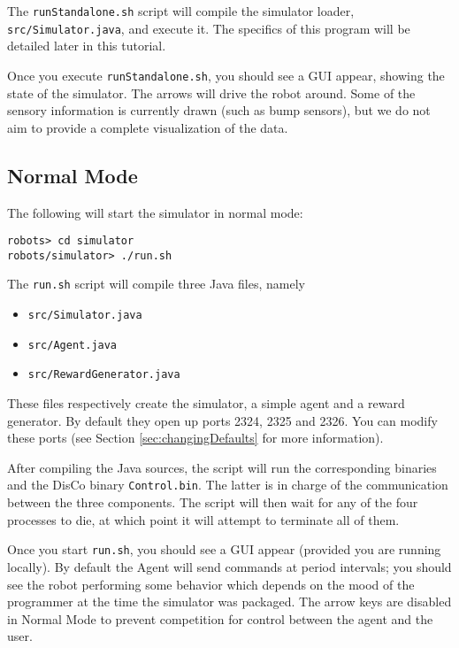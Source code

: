 \documentclass[12pt]{article}
\begin{document}
The \verb+runStandalone.sh+ script will compile the simulator loader,
\verb+src/Simulator.java+, and execute it. The specifics of this program will 
be detailed later in this tutorial.

Once you execute \verb+runStandalone.sh+, you should see a GUI appear, showing
the state of the simulator. The arrows will drive the robot around. Some of the
sensory information is currently drawn (such as bump sensors), but we do not
aim to provide a complete visualization of the data.

\subsection{Normal Mode}

The following will start the simulator in normal mode:

\begin{verbatim}
robots> cd simulator 
robots/simulator> ./run.sh
\end{verbatim}

The \verb+run.sh+ script will compile three Java files, namely

\begin{itemize}
\item{\verb+src/Simulator.java+}
\item{\verb+src/Agent.java+}
\item{\verb+src/RewardGenerator.java+}
\end{itemize}

These files respectively create the simulator, a simple agent and a reward
generator. By default they open up ports 2324, 2325 and 2326. You can modify
these ports (see Section \ref{sec:changingDefaults} for more information).

After compiling the Java sources, the script will run the corresponding
binaries and the DisCo binary \verb+Control.bin+. The latter is in charge
of the communication between the three components. The script will then wait
for any of the four processes to die, at which point it will attempt to 
terminate all of them.

Once you start \verb+run.sh+, you should see a GUI appear (provided you are
running locally). By default the Agent will send commands at period intervals;
you should see the robot performing some behavior which depends on the mood
of the programmer at the time the simulator was packaged. The arrow keys are
disabled in Normal Mode to prevent competition for control between the agent
and the user. 
\end{document}
